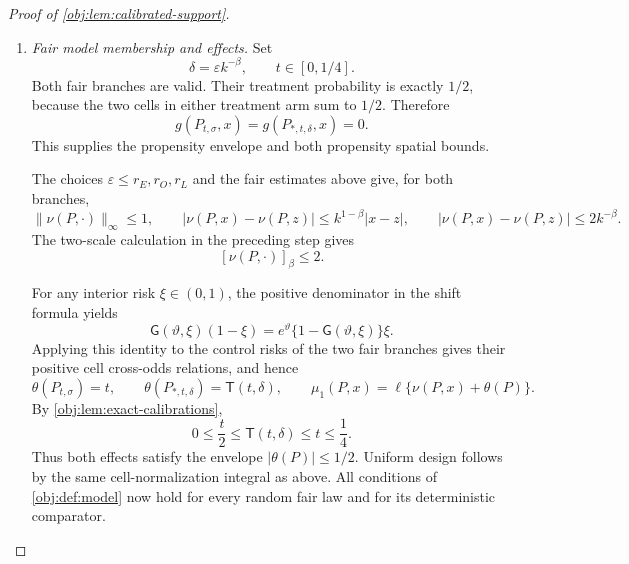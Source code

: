 \documentclass[11pt]{article}
\begin{document}
\begin{proof}[Proof of \cref{obj:lem:calibrated-support}]
\begin{enumerate}
To convert the spatial bounds into the required Hölder bounds, let
\(f:[0,1]\to\mathbb R\), \(0<\gamma\le1\), satisfy
\[
|f(x)-f(z)|\le k^{1-\gamma}|x-z|,
\qquad
|f(x)-f(z)|\le2k^{-\gamma}.
\]
Set
\[
d_{xz}=|x-z|\ge0.
\]
If \(kd_{xz}\le1\), then
\[
|f(x)-f(z)|
\le k^{-\gamma}(kd_{xz})
\le k^{-\gamma}(kd_{xz})^\gamma
=d_{xz}^\gamma.
\]
If \(kd_{xz}\ge1\), then
\[
|f(x)-f(z)|
\le2k^{-\gamma}
\le2k^{-\gamma}(kd_{xz})^\gamma
=2d_{xz}^\gamma.
\]
The first case includes \(x=z\), and both cases include \(\gamma=1\). Thus
\[
[f]_\gamma\le2.
\]
Apply this argument to \(g\) with \(\gamma=\alpha\) and to \(\nu\) with
\(\gamma=\beta\). Together with uniform design, homogeneity, and the three envelopes, these are precisely the conditions of
\cref{obj:def:model}. Hence both mixed laws belong to
\(\mathcal M(\alpha,\beta)\).

\item \textit{Fair model membership and effects.}
Set
\[
\delta=\varepsilon k^{-\beta},
\qquad t\in[0,1/4].
\]
Both fair branches are valid. Their treatment probability is exactly \(1/2\), because the two cells in either treatment arm sum to \(1/2\). Therefore
\[
g(P_{t,\sigma},x)=g(P_{*,t,\delta},x)=0.
\]
This supplies the propensity envelope and both propensity spatial bounds.

The choices \(\varepsilon\le r_E,r_O,r_L\) and the fair estimates above give, for both branches,
\[
\|\nu(P,\cdot)\|_\infty\le1,\qquad
|\nu(P,x)-\nu(P,z)|\le k^{1-\beta}|x-z|,
\qquad
|\nu(P,x)-\nu(P,z)|\le2k^{-\beta}.
\]
The two-scale calculation in the preceding step gives
\[
[\nu(P,\cdot)]_\beta\le2.
\]

For any interior risk \(\xi\in(0,1)\), the positive denominator in the shift formula yields
\[
\mathsf G(\vartheta,\xi)(1-\xi)
=e^\vartheta\{1-\mathsf G(\vartheta,\xi)\}\xi.
\]
Applying this identity to the control risks of the two fair branches gives their positive cell cross-odds relations, and hence
\[
\theta(P_{t,\sigma})=t,\qquad
\theta(P_{*,t,\delta})=\mathsf T(t,\delta),
\qquad
\mu_1(P,x)=\ell\{\nu(P,x)+\theta(P)\}.
\]
By \cref{obj:lem:exact-calibrations},
\[
0\le\frac t2\le\mathsf T(t,\delta)\le t\le\frac14.
\]
Thus both effects satisfy the envelope \( |\theta(P)|\le1/2 \).
Uniform design follows by the same cell-normalization integral as above.
All conditions of \cref{obj:def:model} now hold for every random fair law and for its deterministic comparator.


\end{enumerate}
\end{proof}
\end{document}
